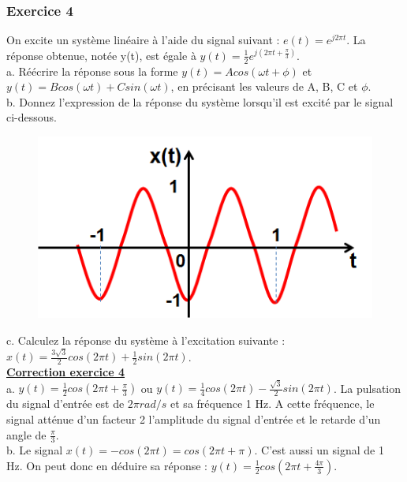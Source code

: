 \documentclass[11pt]{report}
\begin{document}
 	\subsubsection{Exercice 4}
 	
 	On excite un système linéaire à l'aide du signal suivant : $e(t)=e^{j2\pi t}$. La réponse obtenue, notée y(t), est égale à $y(t)=\frac{1}{2}e^{j(2\pi t+\frac{\pi}{3})}$.\\
 	
 	a. Réécrire la réponse sous la forme $y(t)=Acos(\omega t + \phi)$ et $y(t)=Bcos(\omega t)+Csin(\omega t)$, en précisant les valeurs de A, B, C et $\phi$.\\
 	
 	b. Donnez l'expression de la réponse du système lorsqu'il est excité par le signal ci-dessous.
 	
 	\begin{figure}[h!]
 		\centering
 		\includegraphics[scale=0.5]{images/Exo_2_4.png} 
 	\end{figure} 
 	
 	c. Calculez la réponse du système à l'excitation suivante : $x(t)=\frac{3\sqrt{3}}{2}cos(2\pi t)+\frac{1}{2}sin(2\pi t)$.\\
 	
 	
 	\textbf{\underline{Correction exercice 4}}\\
 	
 	a. $y(t)=\frac{1}{2}cos(2\pi t+\frac{\pi}{3})$ ou $y(t)=\frac{1}{4}cos(2\pi t)-\frac{\sqrt{3}}{2}sin(2\pi t)$. La pulsation du signal d'entrée est de $2\pi rad/s$ et sa fréquence 1 Hz. A cette fréquence, le signal atténue d'un facteur 2 l'amplitude du signal d'entrée et le retarde d'un angle de $\frac{\pi}{3}$.\\
 	
 	b. Le signal $x(t)=-cos(2\pi t)=cos(2\pi t+\pi)$. C'est aussi un signal de 1 Hz. On peut donc en déduire sa réponse : $y(t)=\frac{1}{2}cos(2\pi t+\frac{4\pi}{3})$.\\
 	
\end{document}
